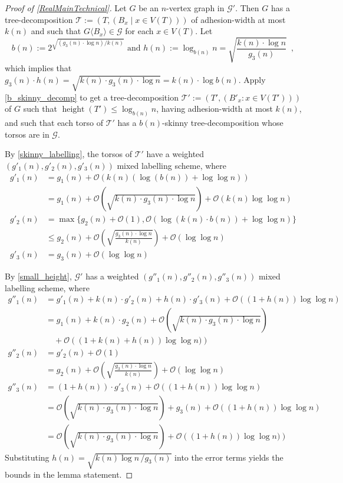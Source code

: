 \documentclass{patmorin}
\renewcommand{\le}{\leqslant}
\DeclareMathOperator{\height}{height}
\newcommand{\torso}[2]{{#1}\langle{#2}\rangle}
\newcommand{\Oh}{\calO}
\newcommand{\calG}{\mathcal{G}}
\newcommand{\calO}{\mathcal{O}}
\newcommand{\calT}{\mathcal{T}}
\begin{document}
  \begin{proof}[Proof of \cref{RealMainTechnical}]
    Let $G$ be an $n$-vertex graph in $\calG'$.
    Then $G$ has a tree-decomposition $\calT:=(T,(B_x\mid x\in V(T)))$ of adhesion-width at most $k(n)$ and such that $\torso{G}{B_x}\in\calG$ for each $x\in V(T)$.
    Let
    \[
      b(n) :=2^{\sqrt{(g_3(n)\cdot\log n)/k(n)}} \text{ and }
      h(n):=\log_{b(n)} n = \sqrt{\frac{k(n)\cdot \log n}{g_3(n)}} \enspace ,
    \]
    which implies that $g_3(n)\cdot h(n)=\sqrt{k(n)\cdot g_3(n)\cdot\log n}=k(n)\cdot \log b(n)$.
    Apply \cref{b_skinny_decomp} to get a tree-decomposition $\calT':=(T',(B'_x:x\in V(T')))$ of $G$ such that $\height(T')\le\log_{b(n)} n$, having adhesion-width at most $k(n)$, and such that each torso of $\calT'$ has a $b(n)$-skinny tree-decomposition whose torsos are in $\calG$.

    By \cref{skinny_labelling}, the torsos of $\calT'$ have a weighted $(g'_1(n),g'_2(n),g'_3(n))$ mixed labelling scheme, where
    \begin{align*}
     g'_1(n) & = g_1(n) + \Oh(k(n)(\log(b(n)) + \log\log n)) \\
     & = g_1(n) + \Oh\left(\sqrt{k(n)\cdot g_3(n)\cdot \log n}\right) + \Oh(k(n)\log\log n) \\
     g'_2(n) & = \max\{g_2(n)+\Oh(1), \Oh(\log(k(n)\cdot b(n))+\log\log n)\} \\
          & \le g_2(n) + \Oh\left(\sqrt{\frac{g_3(n)\cdot \log n}{k(n)}}\right) + \Oh(\log\log n) \\
     g'_3(n) & = g_3(n) + \Oh(\log\log n)
    \end{align*}

    By \cref{small_height}, $\calG'$ has a weighted $(g''_1(n),g''_2(n),g''_3(n))$ mixed labelling scheme, where
    \begin{align*}
     g''_1(n) & = g'_1(n) + k(n)\cdot g'_2(n) + h(n)\cdot g'_3(n) + \Oh((1+h(n))\log\log n) \\
       & = g_1(n) + k(n)\cdot g_2(n) + \Oh\left(\sqrt{k(n)\cdot g_3(n)\cdot \log n}\right) \\
       & \quad {} + \Oh\left((1+k(n)+h(n))\log\log n)\right) \\
     g''_2(n) & = g'_2(n) + \Oh(1) \\
       & = g_2(n) + \Oh\left(\sqrt{\frac{g_3(n)\cdot \log n}{k(n)}}\right) + \Oh(\log\log n) \\
     g''_3(n) & = (1+h(n))\cdot g'_3(n) + \Oh((1+h(n))\log\log n) \\
       & = \Oh\left(\sqrt{k(n)\cdot g_3(n)\cdot \log n}\right) + g_3(n) + \Oh\left((1+h(n))\log\log n\right) \\
       & = \Oh\left(\sqrt{k(n)\cdot g_3(n)\cdot \log n}\right) + \Oh\left((1+h(n))\log\log n)\right)
   \end{align*}
   Substituting $h(n) = \sqrt{k(n)\log n\, / g_3(n)}$ into the error terms yields the bounds in the lemma statement.
  \end{proof}
\end{document}
